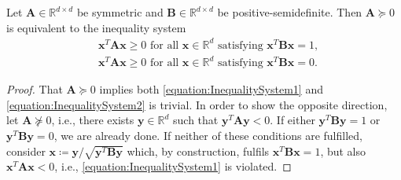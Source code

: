 \documentclass[10pt,conference]{IEEEtran}
\newcommand*{\R}{\mathbb{R}}          %
\newcommand*{\transpose}{T}           %
\begin{document}
\begin{lemma}\label{lemma:InequalitySystem}
    Let $\bm{A} \in \R^{d \times d}$ be symmetric and $\bm{B} \in \R^{d \times d}$ be positive-semidefinite.
    Then $\bm{A} \succeq 0$ is equivalent to the inequality system
    \begin{align}
        &\bm{x}^{\transpose} \bm{A} \bm{x} \geq 0 \text{ for all } \bm{x} \in \R^{d} \text{ satisfying } \bm{x}^{\transpose} \bm{B} \bm{x} = 1, \label{equation:InequalitySystem1} \\
        &\bm{x}^{\transpose} \bm{A} \bm{x} \geq 0 \text{ for all } \bm{x} \in \R^{d} \text{ satisfying } \bm{x}^{\transpose} \bm{B} \bm{x} = 0. \label{equation:InequalitySystem2}
    \end{align}
\end{lemma}

\begin{proof}
    That $\bm{A} \succeq 0$ implies both \eqref{equation:InequalitySystem1} and \eqref{equation:InequalitySystem2} is trivial.
    In order to show the opposite direction, let $\bm{A} \not\succeq 0$, i.e., there exists $\bm{y} \in \R^{d}$ such that $\bm{y}^{\transpose} \bm{A} \bm{y} < 0$.
    If either $\bm{y}^{\transpose} \bm{B} \bm{y} = 1$ or $\bm{y}^{\transpose} \bm{B} \bm{y} = 0$, we are already done.
    If neither of these conditions are fulfilled, consider $\bm{x} \coloneqq \bm{y} / \sqrt{\bm{y}^{\transpose} \bm{B} \bm{y}}$ which, by construction, fulfils $\bm{x}^{\transpose} \bm{B} \bm{x} = 1$, but also $\bm{x}^{\transpose} \bm{A} \bm{x} < 0$, i.e., \eqref{equation:InequalitySystem1} is violated.
\end{proof}
\end{document}
